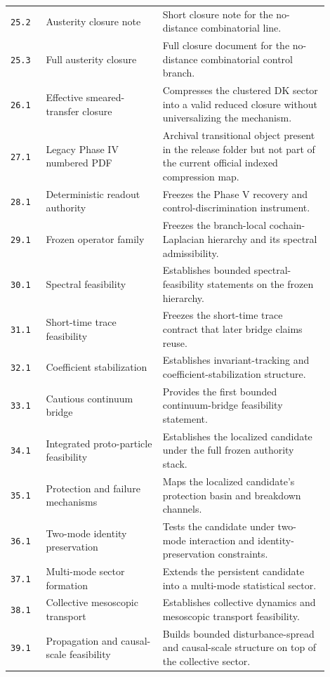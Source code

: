 \documentclass[11pt]{article}
\begin{document}
\begin{longtable}{p{0.10\linewidth}p{0.33\linewidth}p{0.47\linewidth}}
\texttt{25.2} & Austerity closure note & Short closure note for the no-distance combinatorial line. \\
\texttt{25.3} & Full austerity closure & Full closure document for the no-distance combinatorial control branch. \\
\texttt{26.1} & Effective smeared-transfer closure & Compresses the clustered DK sector into a valid reduced closure without universalizing the mechanism. \\
\texttt{27.1} & Legacy Phase IV numbered PDF & Archival transitional object present in the release folder but not part of the current official indexed compression map. \\
\texttt{28.1} & Deterministic readout authority & Freezes the Phase V recovery and control-discrimination instrument. \\
\texttt{29.1} & Frozen operator family & Freezes the branch-local cochain-Laplacian hierarchy and its spectral admissibility. \\
\texttt{30.1} & Spectral feasibility & Establishes bounded spectral-feasibility statements on the frozen hierarchy. \\
\texttt{31.1} & Short-time trace feasibility & Freezes the short-time trace contract that later bridge claims reuse. \\
\texttt{32.1} & Coefficient stabilization & Establishes invariant-tracking and coefficient-stabilization structure. \\
\texttt{33.1} & Cautious continuum bridge & Provides the first bounded continuum-bridge feasibility statement. \\
\texttt{34.1} & Integrated proto-particle feasibility & Establishes the localized candidate under the full frozen authority stack. \\
\texttt{35.1} & Protection and failure mechanisms & Maps the localized candidate's protection basin and breakdown channels. \\
\texttt{36.1} & Two-mode identity preservation & Tests the candidate under two-mode interaction and identity-preservation constraints. \\
\texttt{37.1} & Multi-mode sector formation & Extends the persistent candidate into a multi-mode statistical sector. \\
\texttt{38.1} & Collective mesoscopic transport & Establishes collective dynamics and mesoscopic transport feasibility. \\
\texttt{39.1} & Propagation and causal-scale feasibility & Builds bounded disturbance-spread and causal-scale structure on top of the collective sector. \\

\end{longtable}
\end{document}
